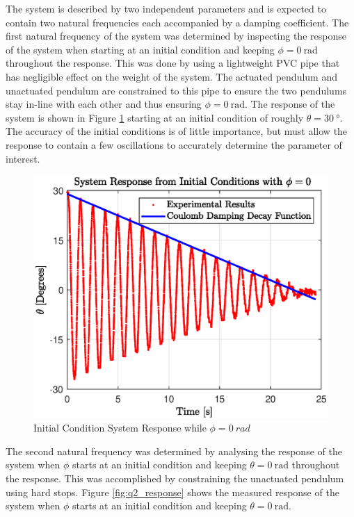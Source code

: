 The system is described by two independent parameters and is expected to contain two natural frequencies each accompanied by a damping coefficient. The first natural frequency of the system was determined by inspecting the response of the system when starting at an initial condition and keeping $\phi = \SI{0}{\radian}$ throughout the response. This was done by using a lightweight PVC pipe that has negligible effect on the weight of the system. The actuated pendulum and unactuated pendulum are constrained to this pipe to ensure the two pendulums stay in-line with each other and thus ensuring $\phi = \SI{0}{\radian}$. The response of the system is shown in Figure \ref{fig:q1_response} starting at an initial condition of roughly $\theta = \SI{30}{\degree}$. The accuracy of the initial conditions is of little importance, but must allow the response to contain a few oscillations to accurately determine the parameter of interest.\\

\begin{figure}[h]
	\centering
	\includegraphics[scale=1]{./figs/q1_initial_response.eps}
	\caption{Initial Condition System Response while $ \phi = \SI{0}{rad} $ }
	\label{fig:q1_response}
\end{figure}


The second natural frequency was determined by analysing the response of the system when $\phi$ starts at an initial condition and keeping $\theta = \SI{0}{\radian}$ throughout the response. This was accomplished by constraining the unactuated pendulum using hard stops. Figure \ref{fig:q2_response} shows the measured response of the system when $\phi$ starts at an initial condition and keeping $\theta = \SI{0}{\radian} $.\\

